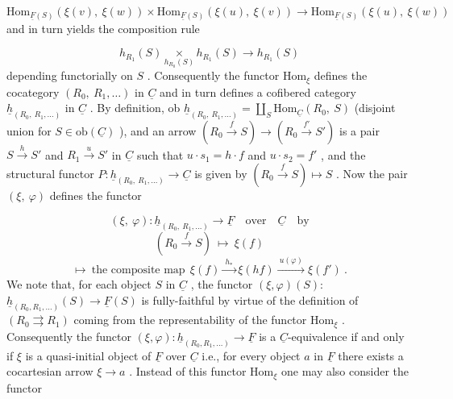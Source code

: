 \begin{equation*}
\mathrm{Hom}_{\underline{F}(S)}(\xi(v),\ \xi(w)) \times \mathrm{Hom}_{\underline{F}(S)}(\xi(u),\ \xi(v)) \to \mathrm{Hom}_{\underline{F}(S)}(\xi(u),\ \xi(w))
\end{equation*}
and in turn yields the composition rule

\begin{equation*}
h_{R_1}(S) \underset{h_{R_0}(S)}{\times} h_{R_1}(S) \to h_{R_1}(S)
\end{equation*}
depending functorially on $S$ . Consequently the functor $\mathrm{Hom}_{\xi}$ defines the cocategory $(R_0,\ R_1,\ldots)$ in $\underline{C}$ and in turn defines a cofibered category $\underline{h}_{(R_0,\ R_1,\ldots)}$ in $\underline{C}$ . By definition, ob $\underline{h}_{(R_0,\ R_1,\ldots)} = \coprod_{S} \mathrm{Hom}_{\underline{C}}(R_0,\ S)$ (disjoint union for $S \in \mathrm{ob}(\underline{C})$ ), and an arrow $(R_0 \xrightarrow{f} S) \to (R_0 \xrightarrow{f'} S')$ is a pair $S \xrightarrow{h} S'$ and $R_1 \xrightarrow{u} S'$ in $\underline{C}$ such that $u \cdot s_1 = h \cdot f$ and $u \cdot s_2 = f'$ , and the structural functor $P : \underline{h}_{(R_0,\ R_1,\ldots)} \to \underline{C}$ is given by $(R_0 \xrightarrow{f} S) \longmapsto S$ . Now the pair $(\xi,\ \varphi)$ defines the functor

\begin{equation*}
(\xi,\ \varphi) : \underline{h}_{(R_0,\ R_1,\ldots)} \to \underline{F} \quad \text{over} \quad \underline{C} \quad \text{by}
\end{equation*}
\begin{equation*}
(R_0 \xrightarrow{f} S) \ \longmapsto\ \xi(f)
\end{equation*}
\begin{equation*}
[(R_0 \xrightarrow{f} S) \xrightarrow{\ (h,u)\ } (R_0 \to S')] \longmapsto \ \text{the composite map}\ \ \xi(f) \xrightarrow{\ h_{*}\ } \xi(hf) \xrightarrow{\ u(\varphi)\ } \xi(f') \ .
\end{equation*}
We note that, for each object $S$ in $\underline{C}$ , the functor $(\xi,\varphi)(S) :$   $\underline{h}_{(R_0,R_1,\ldots)}(S) \to \underline{F}(S)$ is fully-faithful by virtue of the definition of $(R_0 \rightrightarrows R_1)$ coming from the representability of the functor $\mathrm{Hom}_{\xi}$ . Consequently the functor $(\xi,\varphi) : \underline{h}_{(R_0,R_1,\ldots)} \to \underline{F}$ is a $\underline{C}$-equivalence if and only if $\xi$ is a quasi-initial object of $\underline{F}$ over $\underline{C}$ i.e., for every object $a$ in $\underline{F}$ there exists a cocartesian arrow $\xi \to a$ . Instead of this functor $\mathrm{Hom}_{\xi}$ one may also consider the functor

